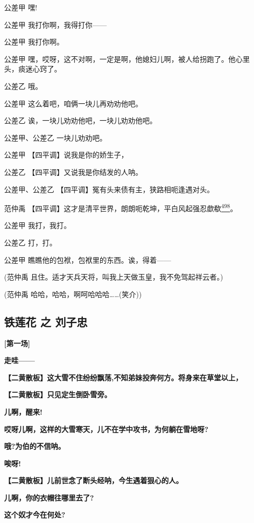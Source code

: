 公差甲 嘿!

公差甲 我打你啊，我得打你------

公差甲 我打你啊。

公差甲
嘿，哎呀，这不对啊，一定是啊，他媳妇儿啊，被人给拐跑了。他心里头，痰迷心窍了。

公差乙 哦。

公差甲 这么着吧，咱俩一块儿再劝劝他吧。

公差乙 诶，一块儿劝劝他吧，一块儿劝劝他吧。

公差甲、公差乙 一块儿劝劝吧。

公差甲 【四平调】说我是你的娇生子，

公差乙 【四平调】又说我是你结发的人呐。

公差甲、公差乙 【四平调】冤有头来债有主，狭路相呃逢遇对头。

范仲禹
【四平调】这才是清平世界，朗朗呃乾坤，平白风起强忍歔欷\protect\hyperlink{fn498}{\textsuperscript{498}}。

公差甲 我打，我打。

公差乙 打，打。

公差甲 瞧瞧他的包袱，包袱里的东西。诶，得着------

(范仲禹 且住。适才天兵天将，叫我上天做玉皇，我不免驾起祥云者。)

(范仲禹 哈哈，哈哈，啊呵哈哈哈\ldots{}\ldots{}(笑介))

\newpage
\hypertarget{ux94c1ux83b2ux82b1-ux4e4b-ux5218ux5b50ux5fe0}{%
\subsection{铁莲花 之
刘子忠}\label{ux94c1ux83b2ux82b1-ux4e4b-ux5218ux5b50ux5fe0}}

\textbf{{[}第一场{]}}

\textbf{走哇------}

\textbf{【二黄散板】这大雪不住纷纷飘荡,不知弟妹投奔何方。将身来在草堂以上，}

\textbf{【二黄散板】只见定生倒卧雪旁。}

\textbf{儿啊，醒来!}

\textbf{哎呀儿啊，这样的大雪寒天，儿不在学中攻书，为何躺在雪地呀?}

\textbf{哦?为伯的不信呐。}

\textbf{唉呀!}

\textbf{【二黄散板】儿前世念了断头经呐，今生遇着狠心的人。}

\textbf{儿啊，你的衣帽往哪里去了?}

\textbf{这个奴才今在何处?}

